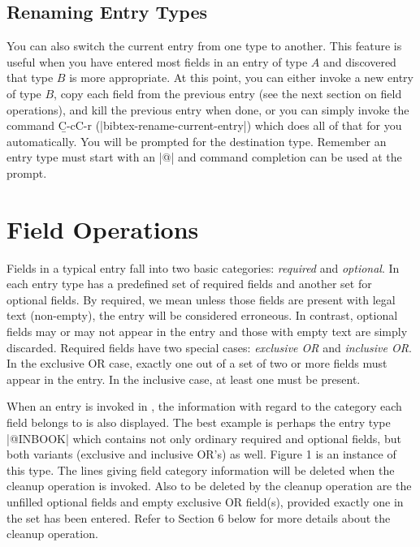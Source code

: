 \section{Renaming Entry Types}

\noindent
You can also switch the current entry from one type to another.
This feature is useful when you have entered most fields in an entry
of type $A$ and discovered that type $B$ is more appropriate.
At this point, you can either invoke a new entry of type $B$, copy each
field from the previous entry (see the next section on field operations),
and kill the previous entry when done, or you can simply invoke
the command \hbox{\b C-c{\s}C-r} \hbox{(|bibtex-rename-current-entry|)}
which does all of that
for you automatically.  You will be prompted for the destination type.
Remember an entry type must start with an |@| and command completion
can be used at the prompt.


\chapter{Field Operations}

\noindent 
Fields in a typical {\BibTeX} entry fall into two basic categories:
{\it required\/} and {\it optional\/}.
In {\BibTeX} each entry type has a predefined set
of required fields and another set for optional fields.
By required, we mean unless those fields are present with legal text
(non-empty), the entry will be considered erroneous.  In contrast, optional 
fields may or may not appear in the entry and those with empty text are
simply discarded.  Required fields have two special cases: {\it exclusive OR\/}
and {\it inclusive OR\/}.  In the exclusive OR case, exactly one out of a 
set of two or more fields must appear in the entry.
In the inclusive case, at least one must be present.

When an entry is invoked in {\BM}, the information with regard to
the category each field belongs to is also displayed.  The best example
is perhaps the entry type |@INBOOK| which contains not only ordinary required
and optional fields, but both variants (exclusive and inclusive OR's) as well.
Figure 1 is an instance of this type.  The lines giving field category
information will be deleted when the cleanup operation is invoked.
Also to be deleted by the cleanup operation are the unfilled optional fields
and empty exclusive OR field(s), provided exactly one in the set has been 
entered.  Refer to Section 6 below for more details about the cleanup operation.

